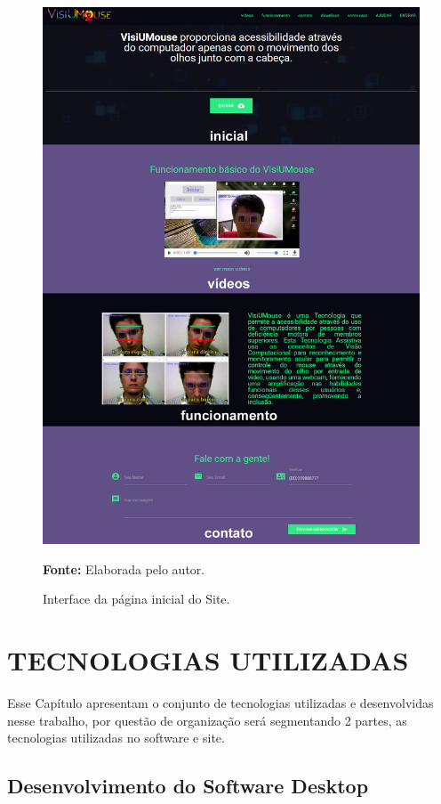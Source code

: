 \begin{figure}[htbp]
\caption{Interface da página inicial do Site.} 
\centering \includegraphics[scale=.33]{img/site.png}

{\fontsize{11}{11}\selectfont \textbf{Fonte:} Elaborada pelo autor.}
\label{fig:site}
\end{figure}

\chapter{TECNOLOGIAS UTILIZADAS}\label{CAP6-tecnilogias-utilizadas}
Esse Capítulo apresentam o conjunto de tecnologias utilizadas e desenvolvidas nesse trabalho, por questão de organização será segmentando 2 partes, as tecnologias utilizadas no software e site.

\section{Desenvolvimento do Software Desktop}\label{Sub:tecnologias-software}

